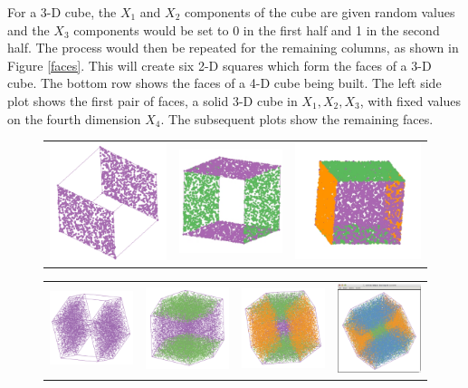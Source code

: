 For a 3-D cube, the $X_1$ and $X_2$ components of the cube are given
random values and the $X_3$ components would be set to 0 in the first
half and 1 in the second half. The process would then be repeated for
the remaining columns, as shown in Figure \ref{faces}. This will
create six 2-D squares which form the faces of a 3-D cube. The bottom row shows the faces of a 4-D cube being built. The
left side plot shows the first pair of faces, a solid 3-D cube in
$X_1, X_2, X_3$, with fixed values on the fourth dimension $X_4$. The
subsequent plots show the remaining faces.

\begin{figure}[ht]
  \centering
  \begin{tabular}{c c c}
    \includegraphics[width=.9in]{fig/cube-x.pdf} &
    \includegraphics[width=.9in]{fig/cube-x-y.pdf} &
    \includegraphics[width=.9in]{fig/cube-x-y-z.pdf}
  \end{tabular}
\begin{tabular}{cccc}
  \includegraphics[width=1in]{fig/cube-4-face-1-1.pdf} & \includegraphics[width=1in]{fig/cube-4-face-2-1.pdf} &
  \includegraphics[width=1in]{fig/cube-4-face-3-1.pdf} &\includegraphics[width=1in]{fig/cube-4-face-4-1.pdf}
\end{tabular}


\end{figure}
